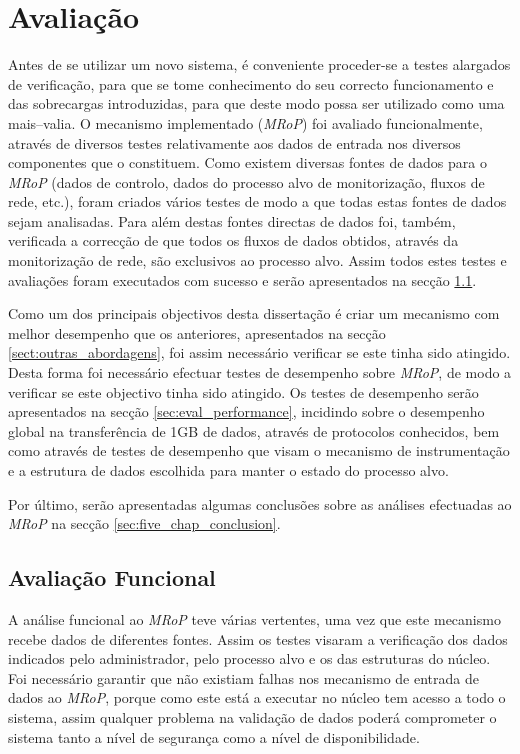 \chapter{Avaliação}
\label{cap:avaliacao}

Antes de se utilizar um novo sistema, é conveniente proceder-se a testes alargados de verificação, para que se tome conhecimento do seu correcto funcionamento e das sobrecargas introduzidas, para que deste modo possa ser utilizado como uma mais–valia.
O mecanismo implementado (\textit{MRoP}) foi avaliado funcionalmente, através de diversos testes relativamente aos dados de entrada nos diversos componentes que o constituem.
Como existem diversas fontes de dados para o \textit{MRoP} (dados de controlo, dados do processo alvo de monitorização, fluxos de rede, etc.), foram criados vários testes de modo a que todas estas fontes de dados sejam analisadas.
Para além destas fontes directas de dados foi, também, verificada a correcção de que todos os fluxos de dados obtidos, através da monitorização de rede, são exclusivos ao processo alvo.
Assim todos estes testes e avaliações foram executados com sucesso e serão apresentados na secção \ref{sec:eval_functional}.

Como um dos principais objectivos desta dissertação é criar um mecanismo com melhor desempenho que os anteriores, apresentados na secção \ref{sect:outras_abordagens}, foi assim necessário verificar se este tinha sido atingido.
Desta forma foi necessário efectuar testes de desempenho sobre \textit{MRoP}, de modo a verificar se este objectivo tinha sido atingido.
Os testes de desempenho serão apresentados na secção \ref{sec:eval_performance}, incidindo sobre o desempenho global na transferência de 1GB de dados, através de protocolos conhecidos, bem como através de testes de desempenho que visam o mecanismo de instrumentação e a estrutura de dados escolhida para manter o estado do processo alvo.

Por último, serão apresentadas algumas conclusões sobre as análises efectuadas ao \textit{MRoP} na secção \ref{sec:five_chap_conclusion}.

\section{Avaliação Funcional}
\label{sec:eval_functional}

A análise funcional ao \textit{MRoP} teve várias vertentes, uma vez que este mecanismo recebe dados de diferentes fontes.
Assim os testes visaram a verificação dos dados indicados pelo administrador, pelo processo alvo e os das estruturas do núcleo.
Foi necessário garantir que não existiam falhas nos mecanismo de entrada de dados ao \textit{MRoP}, porque como este está a executar no núcleo tem acesso a todo o sistema, assim qualquer problema na validação de dados poderá comprometer o sistema tanto a nível de segurança como a nível de disponibilidade.



